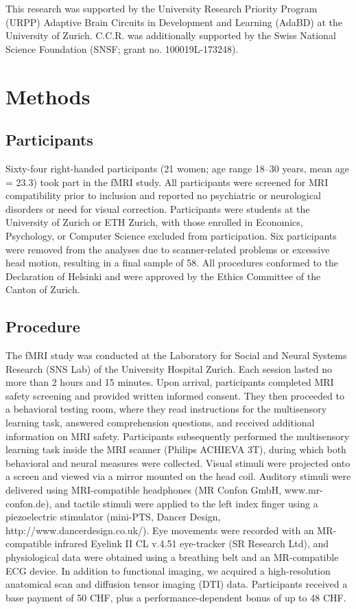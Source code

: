 \documentclass{article}
\begin{document}
This research was supported by the University Research Priority Program (URPP) Adaptive Brain Circuits in Development and Learning (AdaBD) at the University of Zurich. C.C.R. was additionally supported by the Swiss National Science Foundation (SNSF; grant no. 100019L-173248).



\section*{Methods}
\label{sec:methods}


\subsection*{Participants}

Sixty-four right-handed participants (21 women; age range 18–30 years, mean age = 23.3) took part in the fMRI study. All participants were screened for MRI compatibility prior to inclusion and reported no psychiatric or neurological disorders or need for visual correction. Participants were students at the University of Zurich or ETH Zurich, with those enrolled in Economics, Psychology, or Computer Science excluded from participation. Six participants were removed from the analyses due to scanner-related problems or excessive head motion, resulting in a final sample of 58. All procedures conformed to the Declaration of Helsinki and were approved by the Ethics Committee of the Canton of Zurich.

\subsection*{Procedure}

The fMRI study was conducted at the Laboratory for Social and Neural Systems Research (SNS Lab) of the University Hospital Zurich. Each session lasted no more than 2 hours and 15 minutes. Upon arrival, participants completed MRI safety screening and provided written informed consent. They then proceeded to a behavioral testing room, where they read instructions for the multisensory learning task, answered comprehension questions, and received additional information on MRI safety. Participants subsequently performed the multisensory learning task inside the MRI scanner (Philips ACHIEVA 3T), during which both behavioral and neural measures were collected. Visual stimuli were projected onto a screen and viewed via a mirror mounted on the head coil. Auditory stimuli were delivered using MRI-compatible headphones (MR Confon GmbH, www.mr-confon.de), and tactile stimuli were applied to the left index finger using a piezoelectric stimulator (mini-PTS, Dancer Design, http://www.dancerdesign.co.uk/). Eye movements were recorded with an MR-compatible infrared Eyelink II CL v.4.51 eye-tracker (SR Research Ltd), and physiological data were obtained using a breathing belt and an MR-compatible ECG device. In addition to functional imaging, we acquired a high-resolution anatomical scan and diffusion tensor imaging (DTI) data. Participants received a base payment of 50 CHF, plus a performance-dependent bonus of up to 48 CHF.
\end{document}
